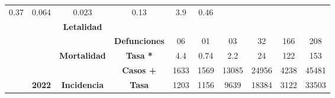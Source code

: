 \begin{tabular}{lccc|cccccc|}
		\multicolumn{1}{c|}{\cellcolor[HTML]{E2EFDA}0.37} &
		\multicolumn{1}{c|}{\cellcolor[HTML]{E2EFDA}0.064} &
		\multicolumn{1}{c|}{\cellcolor[HTML]{E2EFDA}0.023} &
		\multicolumn{1}{c|}{\cellcolor[HTML]{E2EFDA}0.13} &
		\multicolumn{1}{c|}{\cellcolor[HTML]{E2EFDA}3.9} &
		\cellcolor[HTML]{E2EFDA}0.46 \\ \cline{4-10} 
		\multicolumn{1}{l|}{} &
		\multicolumn{1}{c|}{\cellcolor[HTML]{E2EFDA}} &
		\multicolumn{1}{c|}{\multirow{-2}{*}{\cellcolor[HTML]{E2EFDA}\textbf{Letalidad}}} &
		\cellcolor[HTML]{E2EFDA} &
		\multicolumn{1}{c|}{\cellcolor[HTML]{E2EFDA}} &
		\multicolumn{1}{c|}{\cellcolor[HTML]{E2EFDA}} &
		\multicolumn{1}{c|}{\cellcolor[HTML]{E2EFDA}} &
		\multicolumn{1}{c|}{\cellcolor[HTML]{E2EFDA}} &
		\multicolumn{1}{c|}{\cellcolor[HTML]{E2EFDA}} &
		\cellcolor[HTML]{E2EFDA} \\ \cline{3-3}
		\multicolumn{1}{l|}{} &
		\multicolumn{1}{c|}{\cellcolor[HTML]{E2EFDA}} &
		\multicolumn{1}{c|}{\cellcolor[HTML]{E2EFDA}} &
		\multirow{-2}{*}{\cellcolor[HTML]{E2EFDA}\textbf{Defunciones}} &
		\multicolumn{1}{c|}{\multirow{-2}{*}{\cellcolor[HTML]{E2EFDA}06}} &
		\multicolumn{1}{c|}{\multirow{-2}{*}{\cellcolor[HTML]{E2EFDA}01}} &
		\multicolumn{1}{c|}{\multirow{-2}{*}{\cellcolor[HTML]{E2EFDA}03}} &
		\multicolumn{1}{c|}{\multirow{-2}{*}{\cellcolor[HTML]{E2EFDA}32}} &
		\multicolumn{1}{c|}{\multirow{-2}{*}{\cellcolor[HTML]{E2EFDA}166}} &
		\multirow{-2}{*}{\cellcolor[HTML]{E2EFDA}208} \\ \cline{4-10} 
		\multicolumn{1}{l|}{} &
		\multicolumn{1}{c|}{\cellcolor[HTML]{E2EFDA}} &
		\multicolumn{1}{c|}{\multirow{-2}{*}{\cellcolor[HTML]{E2EFDA}\textbf{Mortalidad}}} &
		\cellcolor[HTML]{E2EFDA}\textbf{Tasa *} &
		\multicolumn{1}{c|}{\cellcolor[HTML]{E2EFDA}4.4} &
		\multicolumn{1}{c|}{\cellcolor[HTML]{E2EFDA}0.74} &
		\multicolumn{1}{c|}{\cellcolor[HTML]{E2EFDA}2.2} &
		\multicolumn{1}{c|}{\cellcolor[HTML]{E2EFDA}24} &
		\multicolumn{1}{c|}{\cellcolor[HTML]{E2EFDA}122} &
		\cellcolor[HTML]{E2EFDA}153 \\ \cline{3-10} 
		\multicolumn{1}{l|}{} &
		\multicolumn{1}{c|}{\cellcolor[HTML]{E2EFDA}} &
		\multicolumn{1}{c|}{\cellcolor[HTML]{E2EFDA}} &
		\cellcolor[HTML]{E2EFDA}\textbf{Casos +} &
		\multicolumn{1}{c|}{\cellcolor[HTML]{E2EFDA}1633} &
		\multicolumn{1}{c|}{\cellcolor[HTML]{E2EFDA}1569} &
		\multicolumn{1}{c|}{\cellcolor[HTML]{E2EFDA}13085} &
		\multicolumn{1}{c|}{\cellcolor[HTML]{E2EFDA}24956} &
		\multicolumn{1}{c|}{\cellcolor[HTML]{E2EFDA}4238} &
		\cellcolor[HTML]{E2EFDA}45481 \\ \cline{4-10} 
		\multicolumn{1}{l|}{} &
		\multicolumn{1}{c|}{\multirow{-6}{*}{\cellcolor[HTML]{E2EFDA}\textbf{2022}}} &
		\multicolumn{1}{c|}{\multirow{-2}{*}{\cellcolor[HTML]{E2EFDA}\textbf{Incidencia}}} &
		\cellcolor[HTML]{E2EFDA}\textbf{Tasa} &
		\multicolumn{1}{c|}{\cellcolor[HTML]{E2EFDA}1203} &
		\multicolumn{1}{c|}{\cellcolor[HTML]{E2EFDA}1156} &
		\multicolumn{1}{c|}{\cellcolor[HTML]{E2EFDA}9639} &
		\multicolumn{1}{c|}{\cellcolor[HTML]{E2EFDA}18384} &
		\multicolumn{1}{c|}{\cellcolor[HTML]{E2EFDA}3122} &
		\cellcolor[HTML]{E2EFDA}33503 \\ \cline{2-10} 
	\end{tabular}